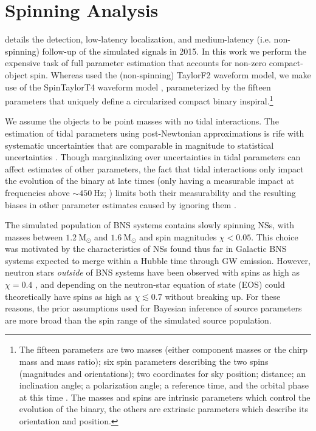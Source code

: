 \section{Spinning Analysis}
\label{sec:spin}

\citet{Singer_2014} details the detection, low-latency localization, and medium-latency (i.e. non-spinning) follow-up of the simulated signals in 2015. In this work we perform the expensive task of full parameter estimation that accounts for non-zero compact-object spin. Whereas \citet{Singer_2014} used the (non-spinning) TaylorF2 waveform model, we make use of the SpinTaylorT4 waveform model \citep{Buonanno_2003,Buonanno_2009}, parameterized by the fifteen parameters that uniquely define a circularized compact binary inspiral.\footnote{The fifteen parameters are two masses (either component masses or the chirp mass and mass ratio); six spin parameters describing the two spins (magnitudes and orientations); two coordinates for sky position; distance; an inclination angle; a polarization angle; a reference time, and the orbital phase at this time \citep[see][for more details]{Veitch_2014}. The masses and spins are intrinsic parameters which control the evolution of the binary, the others are extrinsic parameters which describe its orientation and position.}

We assume the objects to be point masses with no tidal interactions.  The estimation of tidal parameters using post-Newtonian approximations is rife with systematic uncertainties that are comparable in magnitude to statistical uncertainties \cite{Wade_2014}. Though marginalizing over uncertainties in tidal parameters can affect estimates of other parameters, the fact that tidal interactions only impact the evolution of the binary at late times (only having a measurable impact at frequencies above $\sim450~\mathrm{Hz}$; \citealt{Hinderer_2010}) limits both their measurability and the resulting biases in other parameter estimates caused by ignoring them \cite{Damour_2012}.

The simulated population of BNS systems contains slowly spinning NSs, with masses between $1.2~\mathrm{M}_\odot$ and $1.6~\mathrm{M}_\odot$ and spin magnitudes $\chi < 0.05$.  This choice was motivated by the characteristics of NSs found thus far in Galactic BNS systems expected to merge within a Hubble time through GW emission. However, neutron stars \emph{outside} of BNS systems have been observed with spins as high as $\chi = 0.4$ \citep{Hessels_2006,Brown_2012}, and depending on the neutron-star equation of state (EOS) could theoretically have spins as high as $\chi \lesssim 0.7$ \citep{Lo_2011} without breaking up.  For these reasons, the prior assumptions used for Bayesian inference of source parameters are more broad than the spin range of the simulated source population.

